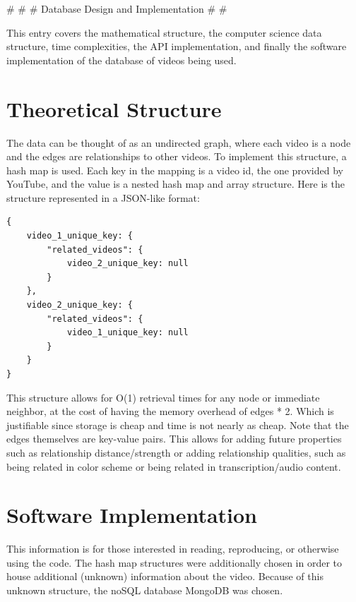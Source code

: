 \documentclass{article}
\newcommand{\br}{ \hfill \break}
\begin{document}
%
%
%
\# \br
\# \br 
\# Database Design and Implementation \br
\# \br 
\# \br
\date{May 25 2020} \br
\begin{adjustwidth}{2.5em}{0pt}

\begin{Overview}
    This entry covers the mathematical structure, the computer science data structure, time complexities, the API implementation, and finally the software implementation of the database of videos being used. 
\end{Overview}

\section{Theoretical Structure}

The data can be thought of as an undirected graph, where each video is a node and the edges are relationships to other videos. To implement this structure, a hash map is used. Each key in the mapping is a video id, the one provided by YouTube, and the value is a nested hash map and array structure. Here is the structure represented in a JSON-like format:

\begin{lstlisting}
{
    video_1_unique_key: {
        "related_videos": {
            video_2_unique_key: null
        }
    },
    video_2_unique_key: {
        "related_videos": {
            video_1_unique_key: null
        }
    }
}
\end{lstlisting}

This structure allows for O(1) retrieval times for any node or immediate neighbor, at the cost of having the memory overhead of edges * 2. Which is justifiable since storage is cheap and time is not nearly as cheap. Note that the edges themselves are key-value pairs. This allows for adding future properties such as relationship distance/strength or adding relationship qualities, such as being related in color scheme or being related in transcription/audio content.

\section{Software Implementation}

This information is for those interested in reading, reproducing, or otherwise using the code. The hash map structures were additionally chosen in order to house additional (unknown) information about the video. Because of this unknown structure, the noSQL database MongoDB was chosen.


\end{adjustwidth}
\end{document}
